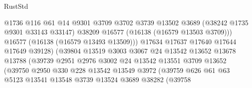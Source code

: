 \begin{lexlean}{RustStd}
\begin{coremodule}
                                      @1736
                                      @116
                                      @61
                                      @14
                                      @9301
                                      @3709
                                      @3702
                                      @3739
                                      @13502
                                      @3689
                                      (@38242 @1735 @9301 @33143 @33147)
                                      @38209
                                      @16577
                                      (@16138 (@16579 @13503 @3709)))
                                    @16577
                                    (@16138 (@16579 @13493 @13509)))
                                  @17634
                                  @17637
                                  @17640
                                  @17644
                                  @17649
                                  @39128)
                                (@39804
                                  @13519
                                  @3003
                                  @3067
                                  @24
                                  @13542
                                  @13652
                                  @13678
                                  @13788
                                  (@39739
                                    @2951
                                    @2976
                                    @3002
                                    @24
                                    @13542
                                    @13551
                                    @3709
                                    @13652
                                    (@39750
                                      @2950
                                      @330
                                      @228
                                      @13542
                                      @13549
                                      @3972
                                      (@39759
                                        @626
                                        @61
                                        @63
                                        @5123
                                        @13541
                                        @13548
                                        @3739
                                        @13524
                                        @3689
                                        @38282
                                        (@39758

\end{coremodule}
\end{lexlean}
